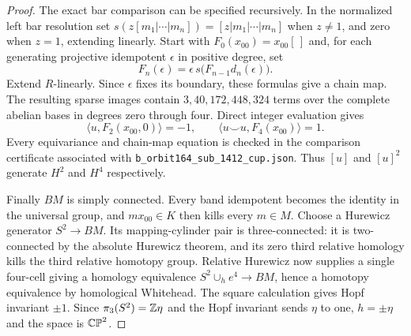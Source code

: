\begin{proof}
The exact bar comparison can be specified recursively.
In the normalized left bar resolution set
$s(z[m_1|\cdots|m_n])=[z|m_1|\cdots|m_n]$ when $z\ne1$,
and zero when $z=1$, extending linearly.
Start with $F_0(x_{00})=x_{00}[\,]$ and, for each generating
projective idempotent $\epsilon$ in positive degree, set
\[
 F_n(\epsilon)=\epsilon\,s\bigl(F_{n-1}d_n(\epsilon)\bigr).
\]
Extend $R$-linearly.  Since $\epsilon$ fixes its boundary,
these formulas give a chain map.
The resulting sparse images contain $3,40,172,448,324$ terms
over the complete abelian bases in degrees zero through four.
Direct integer evaluation gives
\[
 \langle u,F_2(x_{00},0)\rangle=-1,
 \qquad
 \langle u\smile u,F_4(x_{00})\rangle=1.
\]
Every equivariance and chain-map equation is checked in the
comparison certificate associated with
\texttt{b\_orbit164\_sub\_1412\_cup.json}.
Thus $[u]$ and $[u]^2$ generate $H^2$ and $H^4$ respectively.

Finally $BM$ is simply connected.  Every band idempotent becomes
the identity in the universal group, and $mx_{00}\in K$ then
kills every $m\in M$.
Choose a Hurewicz generator $S^2\to BM$.  Its mapping-cylinder
pair is three-connected: it is two-connected by the absolute
Hurewicz theorem, and its zero third relative homology kills the
third relative homotopy group.  Relative Hurewicz now supplies a
single four-cell giving a homology equivalence
$S^2\cup_h e^4\to BM$, hence a homotopy equivalence by
homological Whitehead.  The square calculation gives Hopf
invariant $\pm1$.  Since $\pi_3(S^2)=\mathbb Z\eta$ and the Hopf
invariant sends $\eta$ to one, $h=\pm\eta$ and the space is
$\mathbb {CP}^2$.
\end{proof}
